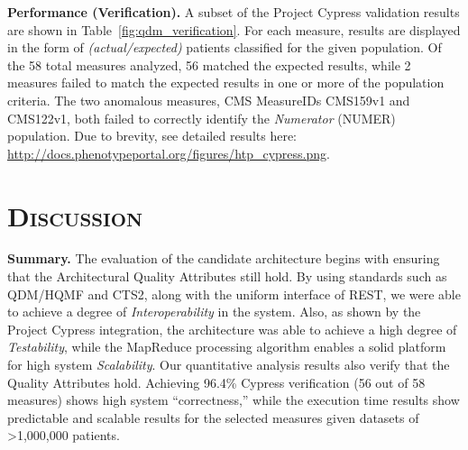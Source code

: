 \documentclass{amia}
\begin{document}
\textbf{Performance (Verification).}
A subset of the Project Cypress validation results are shown in Table~\ref{fig:qdm_verification}. For each measure, results are displayed in the form of \textit{(actual/expected)} patients classified for the given population. Of the 58 total measures analyzed, 56 matched the expected results, while 2 measures failed to match the expected results in one or more of the population criteria. The two anomalous measures, CMS MeasureIDs CMS159v1 and CMS122v1, both failed to correctly identify the \textit{Numerator} (NUMER) population. Due to brevity, see detailed results here: \url{http://docs.phenotypeportal.org/figures/htp_cypress.png}.


\begin{table}%
\end{table}

\section{\textsc{Discussion}}
\textbf{Summary.}
The evaluation of the candidate architecture begins with ensuring that the Architectural Quality Attributes still hold. By using standards such as QDM/HQMF and CTS2, along with the uniform interface of REST, we were able to achieve a degree of \textit{Interoperability} in the system. Also, as shown by the Project Cypress integration, the architecture was able to achieve a high degree of \textit{Testability}, while the MapReduce processing algorithm enables a solid platform for high system \textit{Scalability}.
Our quantitative analysis results also verify that the Quality Attributes hold. Achieving 96.4\% Cypress verification (56 out of 58 measures) shows high system ``correctness,'' while the execution time results show predictable and scalable results for the selected measures given datasets of \textgreater1,000,000 patients. 
\end{document}
